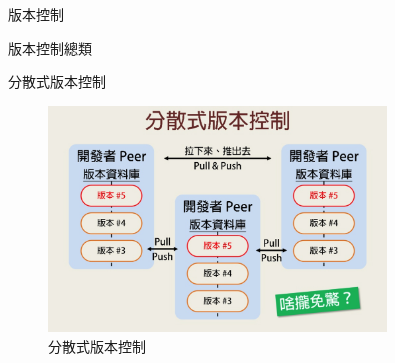\documentclass[pdf,16pt]{beamer}
\begin{document}
\begin{section}{版本控制}
\begin{subsection}{版本控制總類}
      \begin{frame}{分散式版本控制}
        \begin{figure}[h!]
          \includegraphics[width=0.8\textwidth]{images/003.jpg} 
          \caption{分散式版本控制}
        \end{figure}
      \end{frame}
    \end{subsection}
  \end{section}
\end{document}
